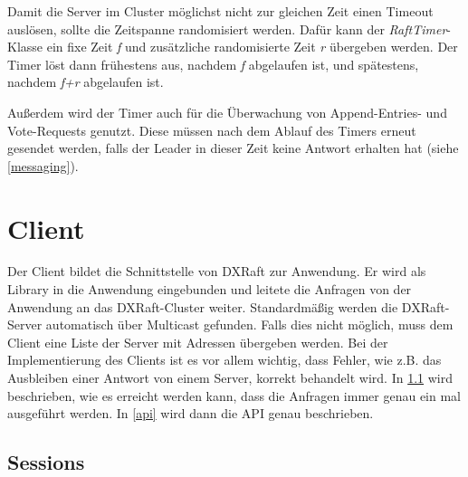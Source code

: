 Damit die Server im Cluster möglichst nicht zur gleichen Zeit einen Timeout auslösen, sollte die Zeitspanne randomisiert werden. Dafür kann der \textit{RaftTimer}-Klasse ein fixe Zeit \textit{f} und zusätzliche randomisierte Zeit \textit{r} übergeben werden. Der Timer löst dann frühestens aus, nachdem \textit{f} abgelaufen ist, und spätestens, nachdem \textit{f+r} abgelaufen ist.

Außerdem wird der Timer auch für die Überwachung von Append-Entries- und Vote-Requests genutzt. Diese müssen nach dem Ablauf des Timers erneut gesendet werden, falls der Leader in dieser Zeit keine Antwort erhalten hat (siehe \ref{messaging}).

\section{Client}

Der Client bildet die Schnittstelle von DXRaft zur Anwendung. Er wird als Library in die Anwendung eingebunden und leitete die Anfragen von der Anwendung an das DXRaft-Cluster weiter. Standardmäßig werden die DXRaft-Server automatisch über Multicast gefunden. Falls dies nicht möglich, muss dem Client eine Liste der Server mit Adressen übergeben werden. Bei der Implementierung des Clients ist es vor allem wichtig, dass Fehler, wie z.B. das Ausbleiben einer Antwort von einem Server, korrekt behandelt wird. In \ref{sessions} wird beschrieben, wie es erreicht werden kann, dass die Anfragen immer genau ein mal ausgeführt werden. In \ref{api} wird dann die API genau beschrieben.

\subsection{Sessions}
\label{sessions}

